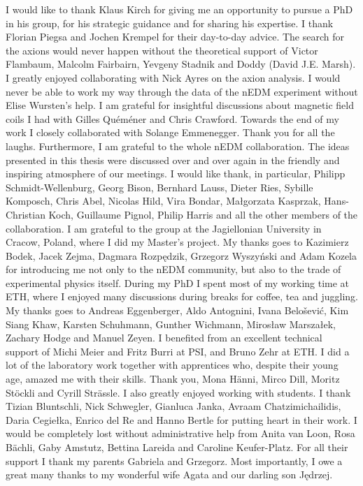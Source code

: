 I would like to thank Klaus Kirch for giving me an opportunity to pursue a PhD in his group, for his strategic guidance and for sharing his expertise.
I thank Florian Piegsa and Jochen Krempel for their day-to-day advice.
The search for the axions would never happen without the theoretical support of Victor Flambaum, Malcolm Fairbairn, Yevgeny Stadnik and Doddy (David J.E. Marsh).
I greatly enjoyed collaborating with Nick Ayres on the axion analysis.
I would never be able to work my way through the data of the nEDM experiment without Elise Wursten's help.
I am grateful for insightful discussions about magnetic field coils I had with Gilles Quéméner and Chris Crawford.
Towards the end of my work I closely collaborated with Solange Emmenegger. Thank you for all the laughs.
Furthermore, I am grateful to the whole nEDM collaboration.
The ideas presented in this thesis were discussed over and over again in the friendly and inspiring atmosphere of our meetings.
I would like thank, in particular,
Philipp Schmidt-Wellenburg,
Georg Bison,
Bernhard Lauss,
Dieter Ries,
Sybille Komposch,
Chris Abel,
Nicolas Hild,
Vira Bondar,
Małgorzata Kasprzak,
Hans-Christian Koch,
Guillaume Pignol,
Philip Harris
and all the other members of the collaboration.
I am grateful to the group at the Jagiellonian University in Cracow, Poland, where I did my Master's project.
My thanks goes to
Kazimierz Bodek,
Jacek Zejma,
Dagmara Rozpędzik,
Grzegorz Wyszyński and
Adam Kozela
for introducing me not only to the nEDM community, but also to the trade of experimental physics itself.
During my PhD I spent most of my working time at ETH, where I enjoyed many discussions during breaks for coffee, tea and juggling.
My thanks goes to
Andreas Eggenberger,
Aldo Antognini,
Ivana Belo\v{s}ević,
Kim Siang Khaw,
Karsten Schuhmann,
Gunther Wichmann,
Mirosław Marszałek,
Zachary Hodge and
Manuel Zeyen.
I benefited from an excellent technical support of Michi Meier and Fritz Burri at PSI, and Bruno Zehr at ETH\@.
I did a lot of the laboratory work together with apprentices who, despite their young age, amazed me with their skills.
Thank you,
Mona Hänni,
Mirco Dill,
Moritz Stöckli and
Cyrill Strässle.
I also greatly enjoyed working with students.
I thank
Tizian Bluntschli,
Nick Schwegler,
Gianluca Janka,
Avraam Chatzimichailidis,
Daria Cegiełka,
Enrico del Re and
Hanno Bertle for putting heart in their work.
I would be completely lost without administrative help from Anita van Loon, Rosa Bächli,
Gaby Amstutz, Bettina Lareida and Caroline Keufer-Platz.
For all their support I thank my parents Gabriela and Grzegorz.
Most importantly, I owe a great many thanks to my wonderful wife Agata and our darling son Jędrzej.

